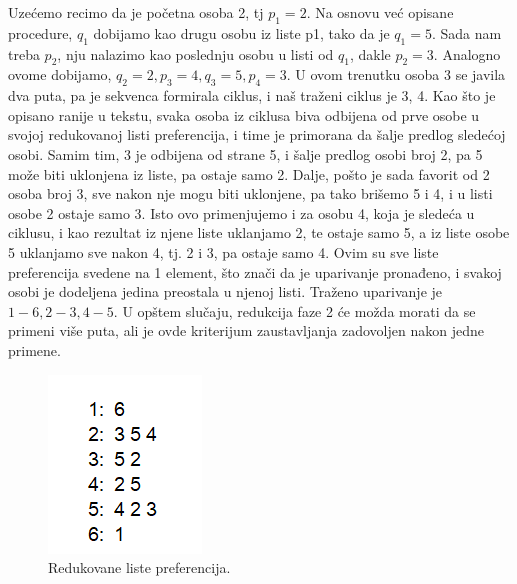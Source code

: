 \documentclass[a4paper]{article}
\begin{document}
Uzećemo recimo da je početna osoba 2, tj $p_1 = 2$. Na osnovu već opisane procedure, $q_1$ dobijamo kao drugu osobu iz liste p1, tako da je $q_1 = 5$. Sada nam treba $p_2$, nju nalazimo kao poslednju osobu u listi od $q_1$, dakle $p_2 = 3$. Analogno ovome dobijamo, $q_2 = 2, p_3 = 4, q_3 = 5, p_4 = 3$. U ovom trenutku osoba 3 se javila dva puta, pa je sekvenca formirala ciklus, i naš traženi ciklus je 3, 4. Kao što je opisano ranije u tekstu, svaka osoba iz ciklusa biva odbijena od prve osobe u svojoj redukovanoj listi preferencija, i time je primorana da šalje predlog sledećoj osobi. Samim tim, 3 je odbijena od strane 5, i šalje predlog osobi broj 2, pa 5 može biti uklonjena iz liste, pa ostaje samo 2. Dalje, pošto je sada favorit od 2 osoba broj 3, sve nakon nje mogu biti uklonjene, pa tako brišemo 5 i 4, i u listi osobe 2 ostaje samo 3.
\newline
Isto ovo primenjujemo i za osobu 4, koja je sledeća u ciklusu, i kao rezultat iz njene liste uklanjamo 2, te ostaje samo 5, a iz liste osobe 5 uklanjamo sve nakon 4, tj. 2 i 3, pa ostaje samo 4. Ovim su sve liste preferencija svedene na 1 element, što znači da je uparivanje pronađeno, i svakoj osobi je dodeljena jedina preostala u njenoj listi. Traženo uparivanje je $1 - 6, 2 - 3, 4 - 5$.
\newline
U opštem slučaju, redukcija faze 2 će možda morati da se primeni više puta, ali je ovde kriterijum zaustavljanja zadovoljen nakon jedne primene.

\begin{figure}[h]
    \centering
    \includegraphics{redukovana.png}
    \caption{Redukovane liste preferencija.}
    \label{red}
\end{figure}

\newpage
\end{document}
